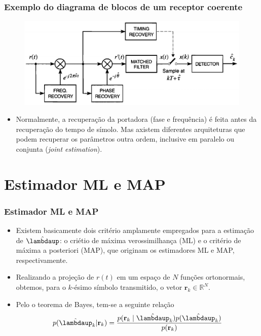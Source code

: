 \begin{frame}[t]
	\frametitle{Exemplo do diagrama de blocos de um receptor coerente}
    \begin{figure}
        \includegraphics[width=0.8\columnwidth]{figs/example.png}
    \end{figure}
	\begin{itemize}
        \item Normalmente, a recuperação da portadora (fase e frequência) é feita antes da recuperação do tempo de símolo. Mas axistem diferentes arquiteturas que podem recuperar os parâmetros outra ordem, inclusive em paralelo ou conjunta (\textit{joint estimation}).
    \end{itemize}
\end{frame}

\section{Estimador ML e MAP}

\begin{frame}
	\frametitle{Estimador ML e MAP}
	\begin{itemize}
		
		\item Existem basicamente dois critério amplamente empregados para a estimação de \(\hat{\boldsymbol{\lambdaup}}\): o criétio de máxima verossimilhança (ML) e o critério de máxima a posteriori (MAP), que originam os estimadores ML e MAP, respectivamente.
		
		\item Realizando a projeção de \(r(t)\) em um espaço de \(N\) funções ortonormais, obtemos, para o \(k\)-ésimo símbolo transmitido, o vetor \(\mathbf{r}_k \in \mathbb{R}^N\).
		
        \item Pelo o teorema de Bayes, tem-se a seguinte relação
        \begin{align}
            p(\hat{\boldsymbol{\lambdaup}}_k | \mathbf{r}_k) = \dfrac{p(\mathbf{r}_k \mid \hat{\boldsymbol{\lambdaup}}_k) p(\hat{\boldsymbol{\lambdaup}}_k)}{p(\mathbf{r}_k)}
        \end{align}

	\end{itemize}
\end{frame}

